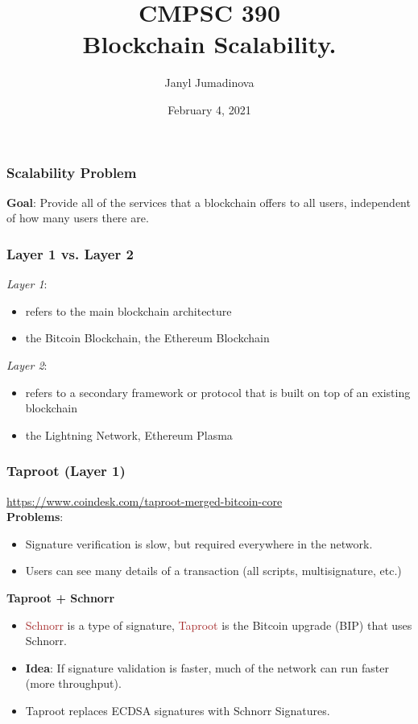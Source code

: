 \documentclass{beamer}
\title{CMPSC 390 \\ Blockchain Scalability.}
\author{Janyl Jumadinova}
\date{February 4, 2021}
\begin{document}
\begin{frame}
  \titlepage
\end{frame}

\begin{frame}
  \frametitle{Scalability Problem}
	\begin{block}{\textbf{Goal}:}
		Provide all of the services that a blockchain offers to all users, independent of how many users there are.
	\end{block}
\end{frame}
\begin{frame}
  \frametitle{Layer 1 vs. Layer 2}
	\begin{block}{\emph{Layer 1}:}
	\begin{itemize}
		\item refers to the main blockchain architecture
		\item the Bitcoin Blockchain, the Ethereum Blockchain
	\end{itemize}
	\end{block}
	\pause
	\begin{block}{\emph{Layer 2}:}
	\begin{itemize}
		\item refers to a secondary framework or protocol that is built on top of an existing blockchain
		\item the Lightning Network, Ethereum Plasma
	\end{itemize}
	\end{block}	
\end{frame}
\begin{frame}
  \frametitle{Taproot (Layer 1)}
 {\tiny{ \url{https://www.coindesk.com/taproot-merged-bitcoin-core}}} \\
 \pause
  \textbf{Problems}:
 \begin{itemize}
 	\item Signature verification is slow, but required everywhere in the network.
	\item Users can see many details of a transaction (all scripts, multisignature, etc.)
  \end{itemize}
  \pause
  \textbf{Taproot + Schnorr}
	\begin{itemize}
		\item \textcolor{brown}{Schnorr} is a type of signature, \textcolor{brown}{Taproot} is the Bitcoin upgrade (BIP) that uses Schnorr. \pause
		\item \textbf{Idea}: If signature validation is faster, much of the network can run faster (more throughput). \pause
		\item Taproot replaces ECDSA signatures with Schnorr Signatures.
	\end{itemize}
\end{frame}
\end{document}
